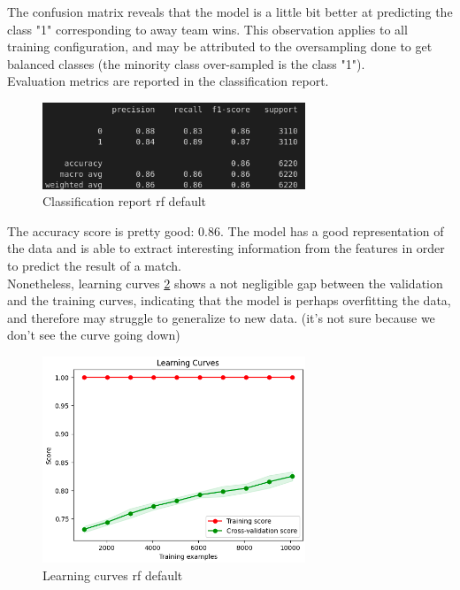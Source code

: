 \documentclass[a4paper,12pt]{article}
\begin{document}
The confusion matrix reveals that the model is a little bit better at predicting the class "1" corresponding to away team wins. This observation applies to all training configuration, and may be attributed to the oversampling done to get balanced classes (the minority class over-sampled is the class "1").\\

Evaluation metrics are reported in the classification report.

\begin{figure}[H]
  \centering
  \includegraphics[width=0.7\textwidth]{./images/report_rf_default.png}
  \caption{Classification report rf default}
  \label{fig:report_rf_default}
\end{figure}

The accuracy score is pretty good: 0.86. The model has a good representation of the data and is able to extract interesting information from the features in order to predict the result of a match.\\

Nonetheless, learning curves \ref{fig:lc_rf_default} shows a not negligible gap between the validation and the training curves, indicating that the model is perhaps overfitting the data, and therefore may struggle to generalize to new data. (it's not sure because we don't see the curve going down)

\begin{figure}[H]
  \centering
  \includegraphics[width=0.7\textwidth]{./images/lc_rf_default.png}
  \caption{Learning curves rf default}
  \label{fig:lc_rf_default}
\end{figure}
\end{document}
